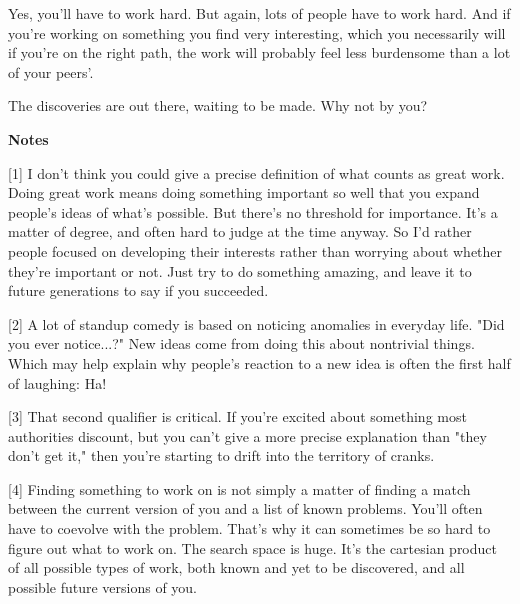Yes, you'll have to work
                  hard. But again, lots of people have to work hard. And if
                  you're working on something you find very interesting, which
                  you necessarily will if you're on the right path, the work
                  will probably feel less burdensome than a lot of your
                  peers'.

The discoveries are out there, waiting to
                  be made. Why not by you?










                  \textbf{Notes}

[1] I don't think you could give a precise definition of what
                  counts as great work. Doing great work means doing something
                  important so well that you expand people's ideas of what's
                  possible. But there's no threshold for importance. It's a
                  matter of degree, and often hard to judge at the time anyway.
                  So I'd rather people focused on developing their interests
                  rather than worrying about whether they're important or not.
                  Just try to do something amazing, and leave it to future
                  generations to say if you succeeded.

[2] A lot of standup comedy is based on noticing anomalies in
                  everyday life. "Did you ever notice...?" New ideas come from
                  doing this about nontrivial things. Which may help explain why
                  people's reaction to a new idea is often the first half of
                  laughing: Ha!

[3] That second qualifier is critical. If you're excited about
                  something most authorities discount, but you can't give a more
                  precise explanation than "they don't get it," then you're
                  starting to drift into the territory of cranks.

[4] Finding something to work on is not simply a matter of
                  finding a match between the current version of you and a list
                  of known problems. You'll often have to coevolve with the
                  problem. That's why it can sometimes be so hard to figure out
                  what to work on. The search space is huge. It's the cartesian
                  product of all possible types of work, both known and yet to
                  be discovered, and all possible future versions of you.

